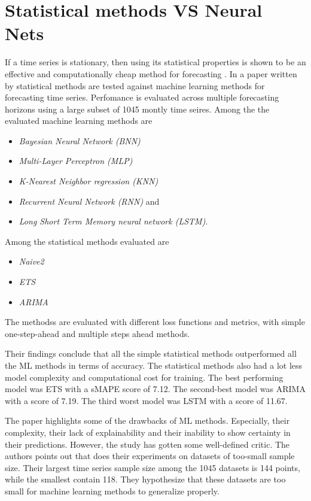 \section{Statistical methods VS Neural Nets}
\label{section:RelatedWork:Statistical-NN}

If a time series is stationary, then using its statistical properties is shown to be an effective and computationally cheap method for forecasting
\cite{Makridakis2018}.
In a paper written by \citeauthor{Makridakis2018} statistical methods are tested against machine learning methods for 
forecasting time series.
Perfomance is evaluated across multiple forecasting horizons using a large subset of 1045 montly time seires.
Among the the evaluated machine learning methods are 
\begin{itemize}
  \item \textit{Bayesian Neural Network (BNN)}
  \item \textit{Multi-Layer Perceptron (MLP)}
  \item \textit{K-Nearest Neighbor regression (KNN)}
  \item \textit{Recurrent Neural Network (RNN)} and
  \item \textit{Long Short Term Memory neural network (LSTM)}.
\end{itemize}

Among the statistical methods evaluated are

\begin{itemize}
  \item \textit{Naive2}
  \item \textit{ETS}
  \item \textit{ARIMA}
\end{itemize}
The methodss are evaluated with different loss functions and metrics, with simple one-step-ahead and multiple steps ahead methods.

Their findings conclude that all the simple statistical methods outperformed all the ML methods in terms of accuracy.
The statistical methods also had a lot less model complexity and computational cost for training.
The best performing model was ETS with a sMAPE score of 7.12.
The second-best model was ARIMA with a score of 7.19.
The third worst model was LSTM with a score of 11.67.

The paper \cite{Makridakis2018} highlights some of the drawbacks of ML methods. Especially, their complexity,
their lack of explainability and their inability to show certainty in their predictions.
However, the study has gotten some well-defined critic. The authors \citeauthor*{Cerqueira2019} points 
out that \cite{Makridakis2018} does their experiments on datasets of too-small sample size.
Their largest time series sample size among the 1045 datasets is 144 points, while the smallest contain 118.
They hypothesize that these datasets are too small for machine learning methods to generalize properly.

